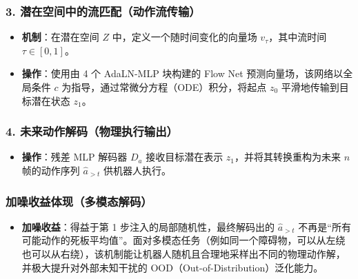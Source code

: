 \hypertarget{ux6f5cux5728ux7a7aux95f4ux4e2dux7684ux6d41ux5339ux914dux52a8ux4f5cux6d41ux4f20ux8f93}{%
\subsubsection{3. 潜在空间中的流匹配（动作流传输）}\label{ux6f5cux5728ux7a7aux95f4ux4e2dux7684ux6d41ux5339ux914dux52a8ux4f5cux6d41ux4f20ux8f93}}

\begin{itemize}
\tightlist
\item
  \textbf{机制}：在潜在空间 \(Z\) 中，定义一个随时间变化的向量场 \(v_{\tau}\)，其中流时间 \(\tau\in[0,1]\)。
\item
  \textbf{操作}：使用由 4 个 AdaLN-MLP 块构建的 Flow Net 预测向量场，该网络以全局条件 \(c\) 为指导，通过常微分方程（ODE）积分，将起点 \(z_0\) 平滑地传输到目标潜在状态 \(z_1\)。
\end{itemize}

\hypertarget{ux672aux6765ux52a8ux4f5cux89e3ux7801ux7269ux7406ux6267ux884cux8f93ux51fa}{%
\subsubsection{4. 未来动作解码（物理执行输出）}\label{ux672aux6765ux52a8ux4f5cux89e3ux7801ux7269ux7406ux6267ux884cux8f93ux51fa}}

\begin{itemize}
\tightlist
\item
  \textbf{操作}：残差 MLP 解码器 \(D_a\) 接收目标潜在表示 \(z_1\)，并将其转换重构为未来 \(n\) 帧的动作序列 \(\hat{a}_{>t}\) 供机器人执行。
\end{itemize}

\hypertarget{ux52a0ux566aux6536ux76caux4f53ux73b0ux591aux6a21ux6001ux89e3ux7801}{%
\subsubsection{加噪收益体现（多模态解码）}\label{ux52a0ux566aux6536ux76caux4f53ux73b0ux591aux6a21ux6001ux89e3ux7801}}

\begin{itemize}
\tightlist
\item
  \textbf{加噪收益}：得益于第 1 步注入的局部随机性，最终解码出的 \(\hat{a}_{>t}\) 不再是``所有可能动作的死板平均值''。面对多模态任务（例如同一个障碍物，可以从左绕也可以从右绕），该机制能让机器人随机且合理地采样出不同的物理动作解，并极大提升对外部未知干扰的 OOD（Out-of-Distribution）泛化能力。
\end{itemize}

